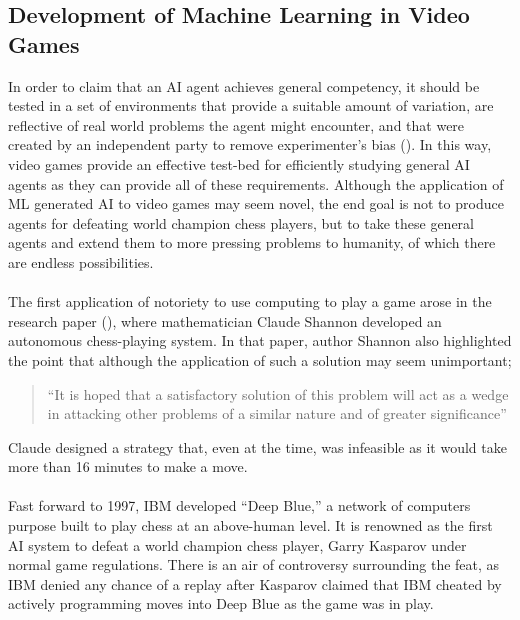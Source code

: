 \subsection{Development of Machine Learning in Video Games}
In order to claim that an AI agent achieves general competency, it should be tested in a set of
environments that provide a suitable amount of variation, are reflective of real world problems the
agent might encounter, and that were created by an independent party to remove experimenter's bias
(\cite{ale-eval-plat}). In this way, video games provide an effective test-bed for efficiently
studying general AI agents as they can provide all of these requirements. Although the application
of ML generated AI to video games may seem novel, the end goal is not to produce agents for
defeating world champion chess players, but to take these general agents and extend them to more
pressing problems to humanity, of which there are endless possibilities. \paragraph{}

The first application of notoriety to use computing to play a game arose in the research paper (\cite{programming-comp-chess}), where
mathematician Claude Shannon developed an autonomous chess-playing system. In that paper, author
Shannon also highlighted the point that although the application of such a solution may seem
unimportant;
\begin{quote}
    ``It is hoped that a satisfactory solution of this problem will act as a wedge in attacking
    other problems of a similar nature and of greater significance''
\end{quote}
Claude designed a strategy that, even at the time, was infeasible as it would take more than 16
minutes to make a move. \paragraph{}

Fast forward to 1997, IBM developed ``Deep Blue,'' a network of computers purpose built to play
chess at an above-human level. It is renowned as the first AI system to defeat a world champion
chess player, Garry Kasparov under normal game regulations. There is an air of controversy
surrounding the feat, as IBM denied any chance of a replay after Kasparov claimed that IBM cheated
by actively programming moves into Deep Blue as the game was in play. \paragraph{}

